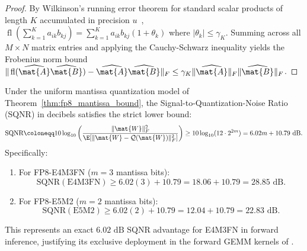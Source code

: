 \begin{proof}
By Wilkinson's running error theorem for standard scalar products of length $K$ accumulated in precision $u$~\cite{higham2002accuracy}, $\operatorname{fl}(\sum_{k=1}^K a_{ik} b_{kj}) = \sum_{k=1}^K a_{ik} b_{kj} (1 + \theta_k)$ where $|\theta_k| \le \gamma_K$.
Summing across all $M \times N$ matrix entries and applying the Cauchy-Schwarz inequality yields the Frobenius norm bound $\|\operatorname{fl}(\widehat{\mat{A}}\widehat{\mat{B}}) - \widehat{\mat{A}}\widehat{\mat{B}}\|_F \le \gamma_K \|\widehat{\mat{A}}\|_F \|\widehat{\mat{B}}\|_F$.
\end{proof}

\begin{corollary}
\label{cor:sqnr_fp8}
Under the uniform mantissa quantization model of Theorem~\ref{thm:fp8_mantissa_bound}, the Signal-to-Quantization-Noise Ratio (SQNR) in decibels satisfies the strict lower bound:
\begin{equation}
\text{SQNR} \coloneqq 10 \log_{10}\left( \frac{\|\mat{W}\|_F^2}{\E[\|\mat{W} - \mathcal{Q}(\mat{W})\|_F^2]} \right) \ge 10 \log_{10}(12 \cdot 2^{2m}) = 6.02 m + 10.79\text{ dB}.
\label{eq:sqnr_lower_bound}
\end{equation}
Specifically:
\begin{enumerate}
    \item For FP8-E4M3FN ($m=3$ mantissa bits):
    \begin{equation}
    \text{SQNR}(\text{E4M3FN}) \ge 6.02(3) + 10.79 = 18.06 + 10.79 = 28.85\text{ dB}.
    \end{equation}
    \item For FP8-E5M2 ($m=2$ mantissa bits):
    \begin{equation}
    \text{SQNR}(\text{E5M2}) \ge 6.02(2) + 10.79 = 12.04 + 10.79 = 22.83\text{ dB}.
    \end{equation}
\end{enumerate}
This represents an exact $6.02\text{ dB}$ SQNR advantage for E4M3FN in forward inference, justifying its exclusive deployment in the forward GEMM kernels of \neuralops{}.
\end{corollary}

